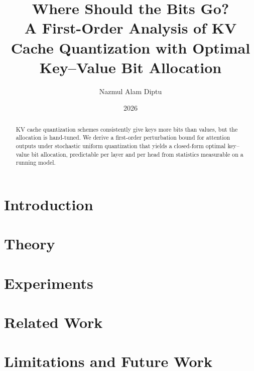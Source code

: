 \documentclass[11pt]{article}
\title{Where Should the Bits Go? \\
  \large A First-Order Analysis of KV Cache Quantization with
  Optimal Key--Value Bit Allocation}
\author{Nazmul Alam Diptu}
\date{2026}
\begin{document}
\maketitle

\begin{abstract}
KV cache quantization schemes consistently give keys more bits than values, but the
allocation is hand-tuned. We derive a first-order perturbation bound for attention
outputs under stochastic uniform quantization that yields a closed-form optimal
key--value bit allocation, predictable per layer and per head from statistics
measurable on a running model.
\end{abstract}

\section{Introduction}          %


\section{Theory}                %


\section{Experiments}           %


\section{Related Work}          %


\section{Limitations and Future Work}
\end{document}

